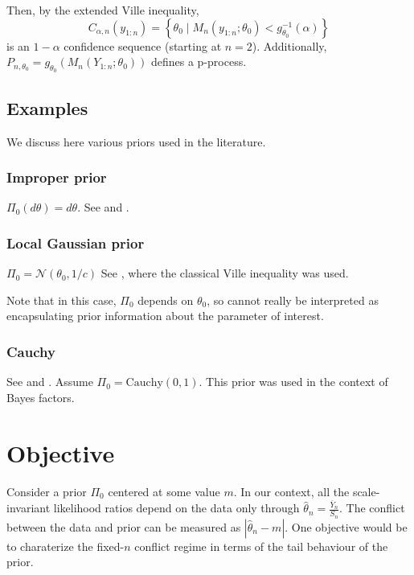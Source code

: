 \documentclass{article}%
\begin{document}
Then, by the extended Ville inequality,
$$
C_{\alpha,n}(y_{1:n})=\left \{\theta_0 \mid M_n(y_{1:n};\theta_0)<g_{\theta_0}^{-1}(\alpha)\right \}
$$
is an $1-\alpha$ confidence sequence (starting at $n=2$). Additionally, $P_{n,\theta_0}=g_{\theta_0}(M_n(Y_{1:n};\theta_0))$ defines a p-process.  

\subsection{Examples}
We discuss here various priors used in the literature.

\subsubsection{Improper prior}

$\Pi_0(d\theta)= d\theta$. See \cite[Theorem 2]{Lai1976} and \cite[Theorem 4.1 and Section 4.4]{Wang2025}.


\subsubsection{Local Gaussian prior}

$\Pi_0=\mathcal N(\theta_0,1/c)$
See  \cite[Section 4.5]{Wang2025}, where the classical Ville inequality was used.

Note that in this case, $\Pi_0$ depends on $\theta_0$, so cannot really be interpreted as encapsulating prior information about the parameter of interest.


\subsubsection{Cauchy}

See \cite{Rouder2009} and \cite[Remark 4.6.4]{Wang2025}. Assume $\Pi_0=\text{Cauchy}(0,1)$. This prior was used in the context of Bayes factors.


\section{Objective}

Consider a prior $\Pi_0$ centered at some value $m$. In our context, all the scale-invariant likelihood ratios depend on the data only through $\widehat\theta_n=\frac{\overline Y_n}{S_n}$. The conflict between the data and prior can be measured as $|\widehat\theta_n-m|$.
One objective would be to charaterize the fixed-$n$ conflict regime in terms of the tail behaviour of the prior.
\end{document}
